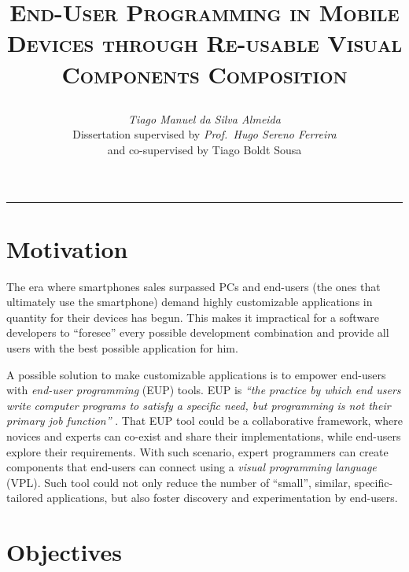 \documentclass[9pt,a4paper]{extarticle}
\begin{document}
\title{\vspace*{-8mm}\textbf{\textsc{End-User Programming in Mobile Devices
through Re-usable Visual Components Composition}}
\author{\emph{Tiago Manuel da Silva Almeida}\\[2mm]
\small{Dissertation supervised by \emph{Prof.\ Hugo Sereno Ferreira}}\\
\small{and co-supervised by Tiago Boldt Sousa}}}
\date{}
\maketitle
\thispagestyle{empty}

\vspace*{-4mm}\noindent\rule{\textwidth}{0.4pt}\vspace*{4mm}

\begin{multicols}{2}

\section{Motivation}\label{sec:motiva}

The era where smartphones sales surpassed PCs and end-users (the ones that ultimately use the smartphone) demand highly customizable applications in quantity for their devices has begun. 
This makes it impractical for a software developers to ``foresee'' every possible development combination and provide all users with the best possible application for him. 

A possible solution to make customizable applications is to empower end-users with \emph{end-user programming} (EUP) tools. 
EUP is \emph{``the practice by which end users write computer programs to satisfy a specific need, but programming is not their primary job function''} \cite{EUSEReport}.
That EUP tool could be a collaborative framework, where novices and experts can co-exist and share their implementations, while end-users explore their requirements. With such scenario, expert programmers can create components that end-users can connect using a \emph{visual programming language} (VPL). Such tool could not only reduce the number of ``small'', similar, specific-tailored applications, but also foster discovery and experimentation by end-users.

\section{Objectives}\label{sec:goals}


\end{multicols}
\end{document}
